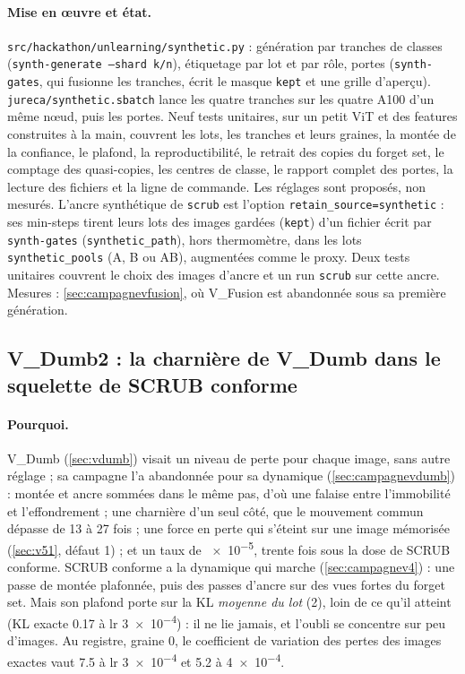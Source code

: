 \documentclass[11pt,a4paper]{article}
\newcommand{\code}[1]{\texttt{#1}}
\newcommand{\chemin}[1]{\nolinkurl{#1}}%
\begin{document}
\paragraph{Mise en œuvre et état.} \chemin{src/hackathon/unlearning/synthetic.py} : génération par
tranches de classes (\code{synth-generate --shard k/n}), étiquetage par lot et par rôle, portes
(\code{synth-gates}, qui fusionne les tranches, écrit le masque \code{kept} et une grille d'aperçu).
\chemin{jureca/synthetic.sbatch} lance les quatre tranches sur les quatre A100 d'un même nœud, puis les
portes. Neuf tests unitaires, sur un petit ViT et des features construites à la main, couvrent les
lots, les tranches et leurs graines, la montée de la confiance, le plafond, la reproductibilité, le
retrait des copies du forget set, le comptage des quasi-copies, les centres de classe, le rapport
complet des portes, la lecture des fichiers et la ligne de commande. Les réglages sont proposés, non
mesurés. L'ancre synthétique de \code{scrub} est l'option \code{retain\_source=synthetic} : ses
min-steps tirent leurs lots des images gardées (\code{kept}) d'un fichier écrit par
\code{synth-gates} (\code{synthetic\_path}), hors thermomètre, dans les lots
\code{synthetic\_pools} (A, B ou AB), augmentées comme le proxy. Deux tests unitaires couvrent le
choix des images d'ancre et un run \code{scrub} sur cette ancre. Mesures :
\cref{sec:campagnevfusion}, où V\_Fusion est abandonnée sous sa première génération.

\subsection{V\_Dumb2 : la charnière de V\_Dumb dans le squelette de SCRUB conforme}\label{sec:vdumb2}
\paragraph{Pourquoi.} V\_Dumb (\cref{sec:vdumb}) visait un niveau de perte pour chaque image, sans
autre réglage ; sa campagne l'a abandonnée pour sa dynamique (\cref{sec:campagnevdumb}) : montée et
ancre sommées dans le même pas, d'où une falaise entre l'immobilité et l'effondrement ; une charnière
d'un seul côté, que le mouvement commun dépasse de 13 à 27 fois ; une force en perte qui s'éteint sur
une image mémorisée (\cref{sec:v51}, défaut 1) ; et un taux de \num{e-5}, trente fois sous la dose de
SCRUB conforme. SCRUB conforme a la dynamique qui marche (\cref{sec:campagnev4}) : une passe de
montée plafonnée, puis des passes d'ancre sur des vues fortes du forget set. Mais son plafond porte sur
la KL \emph{moyenne du lot} (2), loin de ce qu'il atteint (KL exacte \num{0.17} à lr \num{3e-4}) : il ne
lie jamais, et l'oubli se concentre sur peu d'images. Au registre, graine 0, le coefficient de variation
des pertes des images exactes vaut \num{7.5} à lr \num{3e-4} et \num{5.2} à \num{4e-4}.
\end{document}
